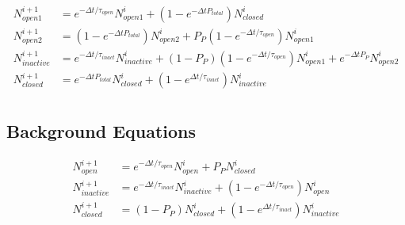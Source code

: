 \documentclass[12pt]{amsart}
\newcommand{\pr}[1]{\left(#1\right)}
\begin{document}
\begin{equation} \label{eq8}
\begin{split}
N_{open1}^{i+1} &=  e^{-\Delta t / \tau_{open}}N_{open1}^{i} + \pr{1 - e^{-\Delta t P_{total}}}N_{closed}^{i} \\ 
N_{open2}^{i+1} &= \pr{1 - e^{-\Delta t P_{total}}}N_{open2}^{i} + P_{P}\pr{1-e^{-\Delta t / \tau_{open}}}N_{open1}^{i} \\ 
N_{inactive}^{i+1} &= e^{-\Delta t / \tau_{inact}}N_{inactive}^{i} + \pr{1-P_{P}}\pr{1-e^{-\Delta t / \tau_{open}}}N_{open1}^{i} + e^{-\Delta t P_{P}}N_{open2}^{i}\\
N_{closed}^{i+1} &= e^{-\Delta t P_{total}}N_{closed}^{i} + \pr{1-e^{\Delta t / \tau_{inact}}}N_{inactive}^{i} \\
\end{split}
\end{equation}

\subsection{Background Equations}

\begin{center}
\end{center}

\begin{equation} \label{eq8}
\begin{split}
N_{open}^{i+1} &=  e^{-\Delta t / \tau_{open}}N_{open}^{i} + P_{P}N_{closed}^{i} \\ 
N_{inactive}^{i+1} &= e^{-\Delta t / \tau_{inact}}N_{inactive}^{i} + \pr{1-e^{-\Delta t / \tau_{open}}}N_{open}^{i}\\
N_{closed}^{i+1} &= \pr{1 - P_{P}}N_{closed}^{i} + \pr{1-e^{\Delta t / \tau_{inact}}}N_{inactive}^{i} \\
\end{split}
\end{equation}
\end{document}
